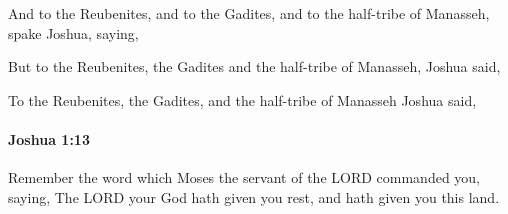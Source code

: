 			\begin{versebox}
					\item[BHS] 
					\item[ASV] And to the Reubenites, and to the Gadites, and to the half-tribe of Manasseh, spake Joshua, saying,
					\item[NIV] But to the Reubenites, the Gadites and the half-tribe of Manasseh, Joshua said,
					\item[NRSV] To the Reubenites, the Gadites, and the half-tribe of Manasseh Joshua said,
			\end{versebox}

		\paragraph{Joshua 1:13} %
			\label{JOSHUA-1-13}

			Remember the word which Moses the servant of the LORD commanded you, saying, The LORD your God hath given you rest, and hath given you this land.

